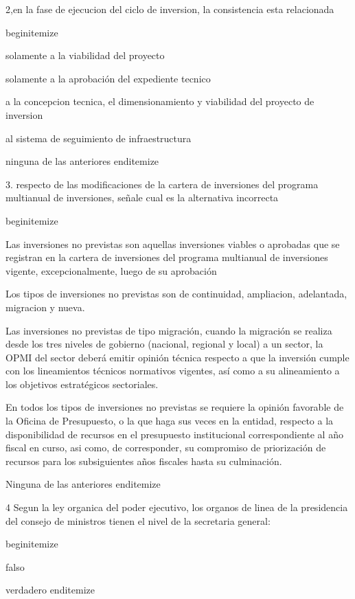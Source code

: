 2,en la fase de ejecucion del ciclo de inversion, la consistencia esta relacionada

begin{itemize}
			\item solamente a la viabilidad del proyecto 
 			\item solamente a la aprobación del expediente tecnico 
			\item a la concepcion tecnica, el dimensionamiento y viabilidad del proyecto de inversion 
			\item al sistema de seguimiento de infraestructura 
			\item ninguna de las anteriores
end{itemize}

3. respecto de las modificaciones de la cartera de inversiones del programa multianual de inversiones, señale cual es la alternativa incorrecta

begin{itemize}
			\item Las inversiones no previstas son aquellas inversiones viables o aprobadas que se registran en la cartera de inversiones del programa multianual de inversiones vigente, excepcionalmente, luego de su aprobación 
 			\item Los tipos de inversiones no previstas son de continuidad, ampliacion, adelantada, migracion y nueva.
			\item Las inversiones no previstas de tipo migración, cuando la migración se realiza desde los tres niveles de gobierno (nacional, regional y local) a un sector, la OPMI del sector deberá emitir opinión técnica respecto a que la inversión cumple con los lineamientos técnicos normativos vigentes, así como a su alineamiento a los objetivos estratégicos sectoriales.
			\item En todos los tipos de inversiones no previstas se requiere la opinión favorable de la Oficina de Presupuesto, o la que haga sus veces en la entidad, respecto a la disponibilidad de recursos en el presupuesto institucional correspondiente al año fiscal en curso, asi como, de corresponder, su compromiso de priorización de recursos para los subsiguientes años fiscales hasta su culminación.
			\item Ninguna de las anteriores
end{itemize}

4 Segun la ley organica del poder ejecutivo, los organos de linea de la presidencia del consejo de ministros tienen el nivel de la secretaria general:


begin{itemize}
			\item falso
 			\item verdadero
end{itemize}



